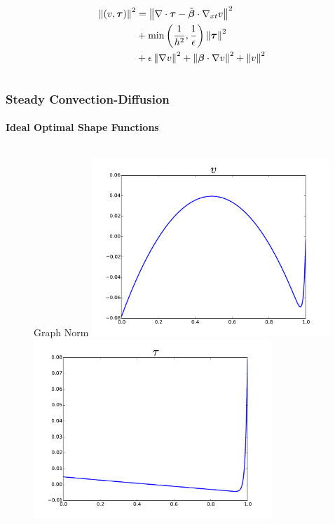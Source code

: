 \documentclass[18pt,xcolor=table]{beamer}
\begin{document}
\begin{frame}[t]
\begin{columns}[t]
\begin{column}{0.5\textwidth}
\begin{figure}[t]
\end{figure}
\vspace{-5ex}
\small{
\begin{align*}
\left\| (v,\boldsymbol\tau) \right\|^2&=
\left\| \nabla\cdot\boldsymbol\tau-\tilde{\boldsymbol\beta}\cdot\nabla_{xt} v \right\|^2\\
&+\min\left( \frac{1}{h^2},\frac{1}{\epsilon} \right)\left\| \boldsymbol\tau \right\|^2\\
&+\epsilon\left\| \nabla v \right\|^2
+\left\| \boldsymbol\beta\cdot\nabla v \right\|^2
+\left\| v \right\|^2
\end{align*}
}
\end{column}
\end{columns}
\end{frame}

\begin{frame}[t]
\frametitle{Steady Convection-Diffusion}
\framesubtitle{Ideal Optimal Shape Functions}
\vspace{-3ex}
\begin{columns}
\begin{column}{0.5\textwidth}
\begin{figure}[t]
\centering
Graph Norm
\includegraphics[width=0.8\textwidth]{OptimalTestFunctions/uLinear_1e-2/steady/graph_steady_v.pdf}\\
\includegraphics[width=0.8\textwidth]{OptimalTestFunctions/uLinear_1e-2/steady/graph_steady_tau.pdf}

\end{figure}
\end{column}
\end{columns}
\end{frame}
\end{document}
